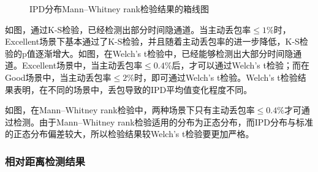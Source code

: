 {	\begin{figure}[htbp]
        \centering
        \caption{IPD分布Mann–Whitney rank检验结果的箱线图}
        \label{fig:3:result:ipd:mw}
	\end{figure}
}

如图，通过K-S检验，已经检测出部分时间隐通道。当主动丢包率$\le 1\%$时，Excellent场景下基本通过了K-S检验，并且随着主动丢包率的进一步降低，K-S检验的p值逐渐增大。如图，在Welch's t检验中，已经能够检测出大部分时间隐通道。Excellent场景中，当主动丢包率$\le 0.4\%$后，才可以通过Welch's t检验；而在Good场景中，当主动丢包率$\le 2\%$时，即可通过Welch's t检验。Welch's t检验结果表明，在不同的场景中，丢包导致的IPD平均值变化程度不同。

如图，在Mann–Whitney rank检验中，两种场景下只有主动丢包率$\le 0.4\%$才可通过检测。由于Mann–Whitney rank检验适用的分布为正态分布，而IPD分布与标准的正态分布偏差较大，所以检验结果较Welch's t检验要更加严格。

\subsubsection{相对距离检测结果}
\label{chap:analyze:result:ipd:distance}

